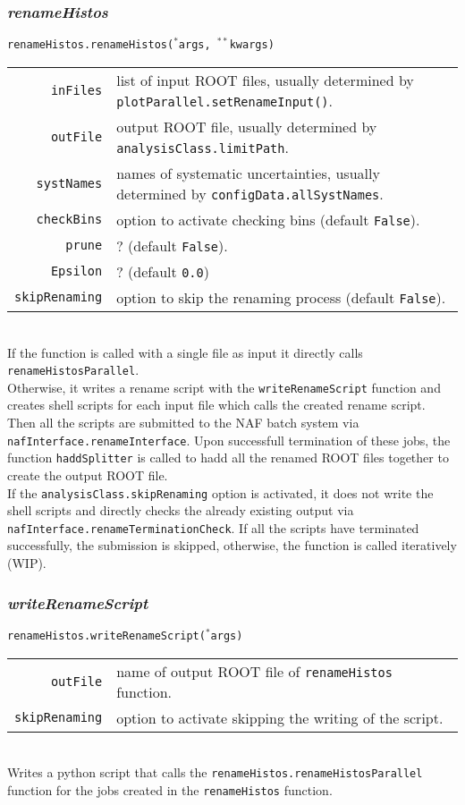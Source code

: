 \documentclass[12pt, a4paper]{article}
\newcommand{\args}{$^*$args}
\newcommand{\kwargs}{$^{**}$kwargs}
\begin{document}
\subsubsection{\textit{renameHistos}}
\texttt{renameHistos.renameHistos(\args, \kwargs)}\\
\begin{tabular}{r|l}
\hline
\texttt{inFiles}		&	list of input ROOT files, usually determined by \texttt{plotParallel.setRenameInput()}.\\
\texttt{outFile}		&	output ROOT file, usually determined by \texttt{analysisClass.limitPath}.\\
\texttt{systNames}		&	names of systematic uncertainties, usually determined by \texttt{configData.allSystNames}.\\
\texttt{checkBins}		&	option to activate checking bins (default \texttt{False}).\\
\texttt{prune}			&	? (default \texttt{False}).\\
\texttt{Epsilon}		&	? (default \texttt{0.0})\\
\texttt{skipRenaming}	&	option to skip the renaming process (default \texttt{False}).\\
\hline
\end{tabular}
\\
If the function is called with a single file as input it directly calls \texttt{renameHistosParallel}.\\
Otherwise, it writes a rename script with the \texttt{writeRenameScript} function and creates shell scripts for each input file which calls the created rename script. 
Then all the scripts are submitted to the NAF batch system via \texttt{nafInterface.renameInterface}.
Upon successfull termination of these jobs, the function \texttt{haddSplitter} is called to hadd all the renamed ROOT files together to create the output ROOT file.\\
If the \texttt{analysisClass.skipRenaming} option is activated, it does not write the shell scripts and directly checks the already existing output via \texttt{nafInterface.renameTerminationCheck}. If all the scripts have terminated successfully, the submission is skipped, otherwise, the function is called iteratively (WIP).


\subsubsection{\textit{writeRenameScript}}
\texttt{renameHistos.writeRenameScript(\args)}\\
\begin{tabular}{r|l}
\hline
\texttt{outFile}	 &	name of output ROOT file of \texttt{renameHistos} function.\\
\texttt{skipRenaming}&  option to activate skipping the writing of the script.\\
\hline
\end{tabular}
\\
Writes a python script that calls the \texttt{renameHistos.renameHistosParallel} function for the jobs created in the \texttt{renameHistos} function.\\
\end{document}
